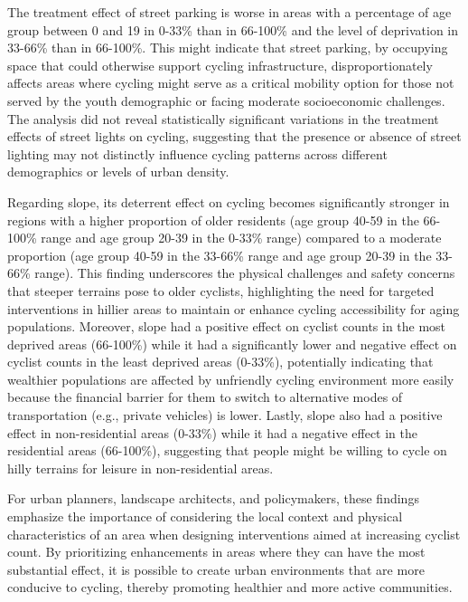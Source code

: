 \documentclass[preprint,12pt, authoryear]{elsarticle}
\begin{document}
The treatment effect of street parking is worse in areas with a percentage of age group between 0 and 19 in 0-33\% than in 66-100\% and the level of deprivation in 33-66\% than in 66-100\%. This might indicate that street parking, by occupying space that could otherwise support cycling infrastructure, disproportionately affects areas where cycling might serve as a critical mobility option for those not served by the youth demographic or facing moderate socioeconomic challenges. The analysis did not reveal statistically significant variations in the treatment effects of street lights on cycling, suggesting that the presence or absence of street lighting may not distinctly influence cycling patterns across different demographics or levels of urban density.

Regarding slope, its deterrent effect on cycling becomes significantly stronger in regions with a higher proportion of older residents (age group 40-59 in the 66-100\% range and age group 20-39 in the 0-33\% range) compared to a moderate proportion (age group 40-59 in the 33-66\% range and age group 20-39 in the 33-66\% range). This finding underscores the physical challenges and safety concerns that steeper terrains pose to older cyclists, highlighting the need for targeted interventions in hillier areas to maintain or enhance cycling accessibility for aging populations. Moreover, slope had a positive effect on cyclist counts in the most deprived areas (66-100\%) while it had a significantly lower and negative effect on cyclist counts in the least deprived areas (0-33\%), potentially indicating that wealthier populations are affected by unfriendly cycling environment more easily because the financial barrier for them to switch to alternative modes of transportation (e.g., private vehicles) is lower. Lastly, slope also had a positive effect in non-residential areas (0-33\%) while it had a negative effect in the residential areas (66-100\%), suggesting that people might be willing to cycle on hilly terrains for leisure in non-residential areas. 

 For urban planners, landscape architects, and policymakers, these findings emphasize the importance of considering the local context and physical characteristics of an area when designing interventions aimed at increasing cyclist count. By prioritizing enhancements in areas where they can have the most substantial effect, it is possible to create urban environments that are more conducive to cycling, thereby promoting healthier and more active communities.
\end{document}
